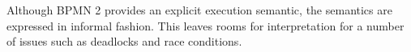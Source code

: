 %

Although BPMN 2 provides an explicit execution semantic, the semantics are expressed in  informal fashion. This leaves rooms for interpretation for a number of issues such as deadlocks and race conditions. 


